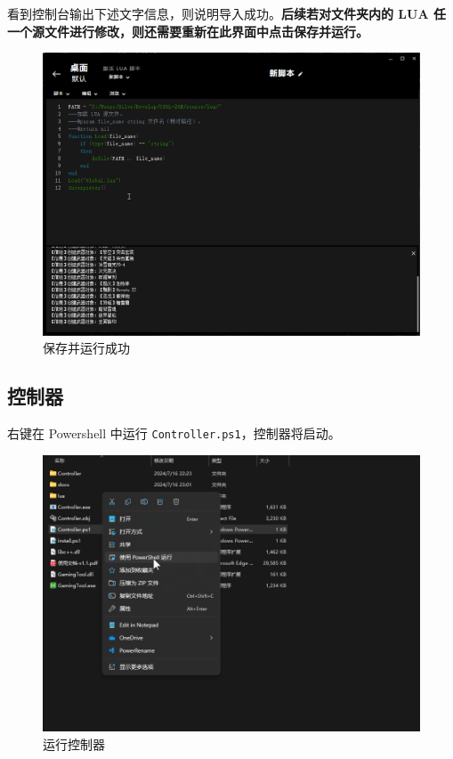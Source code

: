 看到控制台输出下述文字信息，则说明导入成功。\textbf{后续若对文件夹内的 LUA 任一个源文件进行修改，则还需要重新在此界面中点击保存并运行。}

\begin{figure}[H]
    \Centering
    \includegraphics[width=\textwidth]{docs/assets/success.png}
    \caption{保存并运行成功}
\end{figure}

\subsection{控制器}

右键在 Powershell 中运行 \lstinline{Controller.ps1}，控制器将启动。

\begin{figure}[H]
    \Centering
    \includegraphics[width=\textwidth]{docs/assets/run_controller.png}
    \caption{运行控制器}
\end{figure}

